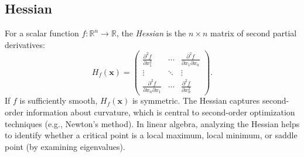 \subsection{Hessian}
For a scalar function $f : \mathbb{R}^n \to \mathbb{R}$, the \emph{Hessian} is the $n \times n$ matrix 
of second partial derivatives:
\[
H_f(\mathbf{x}) 
= \begin{pmatrix}
\frac{\partial^2 f}{\partial x_1^2} & \cdots & \frac{\partial^2 f}{\partial x_1 \partial x_n} \\
\vdots & \ddots & \vdots \\
\frac{\partial^2 f}{\partial x_n \partial x_1} & \cdots & \frac{\partial^2 f}{\partial x_n^2}
\end{pmatrix}.
\]
If $f$ is sufficiently smooth, $H_f(\mathbf{x})$ is symmetric. The Hessian 
captures second-order information about curvature, which is central to second-order optimization 
techniques (e.g., Newton’s method). In linear algebra, analyzing the Hessian helps to identify whether 
a critical point is a local maximum, local minimum, or saddle point (by examining eigenvalues).

